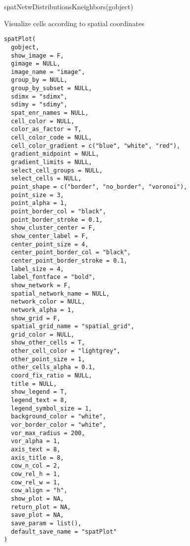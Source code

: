\documentclass[a4paper]{book}
\begin{document}
%
\begin{Examples}
\begin{ExampleCode}
    spatNetwDistributionsKneighbors(gobject)
\end{ExampleCode}
\end{Examples}
%
\begin{Description}\relax
Visualize cells according to spatial coordinates
\end{Description}
%
\begin{Usage}
\begin{verbatim}
spatPlot(
  gobject,
  show_image = F,
  gimage = NULL,
  image_name = "image",
  group_by = NULL,
  group_by_subset = NULL,
  sdimx = "sdimx",
  sdimy = "sdimy",
  spat_enr_names = NULL,
  cell_color = NULL,
  color_as_factor = T,
  cell_color_code = NULL,
  cell_color_gradient = c("blue", "white", "red"),
  gradient_midpoint = NULL,
  gradient_limits = NULL,
  select_cell_groups = NULL,
  select_cells = NULL,
  point_shape = c("border", "no_border", "voronoi"),
  point_size = 3,
  point_alpha = 1,
  point_border_col = "black",
  point_border_stroke = 0.1,
  show_cluster_center = F,
  show_center_label = F,
  center_point_size = 4,
  center_point_border_col = "black",
  center_point_border_stroke = 0.1,
  label_size = 4,
  label_fontface = "bold",
  show_network = F,
  spatial_network_name = NULL,
  network_color = NULL,
  network_alpha = 1,
  show_grid = F,
  spatial_grid_name = "spatial_grid",
  grid_color = NULL,
  show_other_cells = T,
  other_cell_color = "lightgrey",
  other_point_size = 1,
  other_cells_alpha = 0.1,
  coord_fix_ratio = NULL,
  title = NULL,
  show_legend = T,
  legend_text = 8,
  legend_symbol_size = 1,
  background_color = "white",
  vor_border_color = "white",
  vor_max_radius = 200,
  vor_alpha = 1,
  axis_text = 8,
  axis_title = 8,
  cow_n_col = 2,
  cow_rel_h = 1,
  cow_rel_w = 1,
  cow_align = "h",
  show_plot = NA,
  return_plot = NA,
  save_plot = NA,
  save_param = list(),
  default_save_name = "spatPlot"
)
\end{verbatim}
\end{Usage}
%
\end{document}

